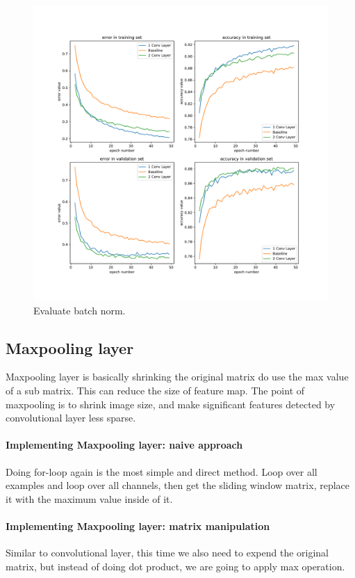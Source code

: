 \documentclass{article}
\begin{document}
\begin{figure}[tb]
\begin{center}
\centerline{\includegraphics[width=\columnwidth]{fig/cnn.pdf}}
\caption{Evaluate batch norm.}
\label{fig:cnn}
\end{center}
\end{figure} 


\subsection{Maxpooling layer}
Maxpooling layer is basically shrinking the original matrix do use the max value of a sub matrix. This can reduce the size of feature map. The point of maxpooling is to shrink image size, and make significant features detected by convolutional layer less sparse. 
\paragraph{Implementing Maxpooling layer: naive approach}
Doing for-loop again is the most simple and direct method. Loop over all examples and loop over all channels, then get the sliding window matrix, replace it with the maximum value inside of it.

\paragraph{Implementing Maxpooling layer: matrix manipulation}
Similar to convolutional layer, this time we also need to expend the original matrix, but instead of doing dot product, we are going to apply max operation.
\end{document}
